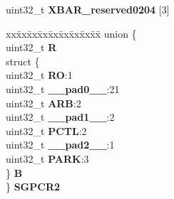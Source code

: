 \begin{DoxyCompactItemize}
\begin{tabbing}
\end{tabbing}\item 
\mbox{\label{structXBAR__tag_a6b244c5fafd54fc51eefd5e41ffc2ec5}} 
uint32\+\_\+t {\bfseries X\+B\+A\+R\+\_\+reserved0204} \mbox{[}3\mbox{]}
\item 
\mbox{\label{structXBAR__tag_a819e05834954de926154a6da5e6613b6}} 
\begin{tabbing}
xx\=xx\=xx\=xx\=xx\=xx\=xx\=xx\=xx\=\kill
union \{\\
\>uint32\_t {\bfseries R}\\
\>struct \{\\
\>\>uint32\_t {\bfseries RO}:1\\
\>\>uint32\_t {\bfseries \_\_pad0\_\_}:21\\
\>\>uint32\_t {\bfseries ARB}:2\\
\>\>uint32\_t {\bfseries \_\_pad1\_\_}:2\\
\>\>uint32\_t {\bfseries PCTL}:2\\
\>\>uint32\_t {\bfseries \_\_pad2\_\_}:1\\
\>\>uint32\_t {\bfseries PARK}:3\\
\>\} {\bfseries B}\\
\} {\bfseries SGPCR2}\\


\end{tabbing}
\end{DoxyCompactItemize}
